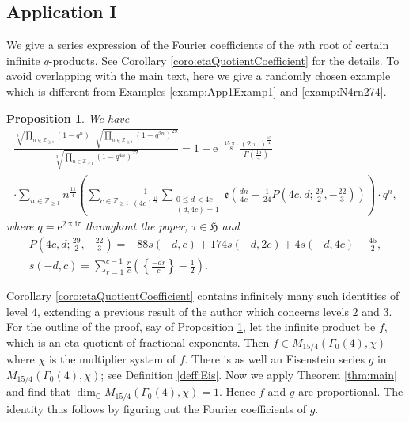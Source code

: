 \documentclass[12pt]{amsart}
\numberwithin{equation}{section}
\theoremstyle{plain}
\newtheorem{prop}[thm]{Proposition}
\theoremstyle{definition}
\theoremstyle{remark}
\newcommand\twoscript[2]{\substack{{#1} \\ {#2}}}
\newcommand\rmi{\mathrm{i}}
\newcommand\rme{\mathrm{e}}
\newcommand\etp[1]{\mathfrak{e}\left(#1\right)}
\newcommand\numC{\mathbb{C}}
\newcommand\numgeq[2]{\mathbb{#1}_{\geq #2}}
\newcommand\uhp{\mathfrak{H}}
\begin{document}
\subsection{Application I}
\label{subsec:AppI}
We give a series expression of the Fourier coefficients of the $n$th root of certain infinite $q$-products. See Corollary \ref{coro:etaQuotientCoefficient} for the details. To avoid overlapping with the main text, here we give a randomly chosen example which is different from Examples \ref{examp:App1Examp1} and \ref{examp:N4rn274}.
\begin{prop}
\label{prop:inIntroExamp}
We have
\begin{multline*}
\frac{\sqrt[3]{\prod_{n\in\numgeq{Z}{1}}(1-q^n)}\cdot\sqrt{\prod_{n\in\numgeq{Z}{1}}(1-q^{2n})^{29}}}{\sqrt[3]{\prod_{n\in\numgeq{Z}{1}}(1-q^{4n})^{22}}}=1+\rme^{-\frac{15\uppi\rmi}{8}}\frac{(2\uppi)^{\frac{15}{4}}}{\Gamma(\frac{15}{4})}\\
\cdot\sum_{n\in\numgeq{Z}{1}}n^{\frac{11}{4}}\left(\sum_{c\in\numgeq{Z}{1}}\frac{1}{(4c)^{\frac{15}{4}}}\sum_{\twoscript{0\leq d<4c}{(d,4c)=1}}\etp{\frac{dn}{4c}-\frac{1}{24}P(4c,d;\frac{29}{2},-\frac{22}{3})}\right)\cdot q^n,
\end{multline*}
where $q=\rme^{2\uppi\rmi\tau}$ throughout the paper, $\tau\in\uhp$ and
\begin{gather*}
P(4c,d;\frac{29}{2},-\frac{22}{3})=-88s(-d,c)+174s(-d,2c)+4s(-d,4c)-\frac{45}{2},\\
s(-d,c)=\sum_{r=1}^{c-1}\frac{r}{c}\left(\left\{\frac{-dr}{c}\right\}-\frac{1}{2}\right).
\end{gather*}
\end{prop}

Corollary \ref{coro:etaQuotientCoefficient} contains infinitely many such identities of level $4$, extending a previous result of the author \cite[Theorem 7.1]{Zhu23} which concerns levels $2$ and $3$. For the outline of the proof, say of Proposition \ref{prop:inIntroExamp}, let the infinite product be $f$, which is an eta-quotient of fractional exponents. Then $f\in M_{15/4}(\Gamma_0(4),\chi)$ where $\chi$ is the multiplier system of $f$. There is as well an Eisenstein series $g$ in $M_{15/4}(\Gamma_0(4),\chi)$; see Definition \ref{deff:Eis}. Now we apply Theorem \ref{thm:main} and find that $\dim_\numC M_{15/4}(\Gamma_0(4),\chi)=1$. Hence $f$ and $g$ are proportional. The identity thus follows by figuring out the Fourier coefficients of $g$.
\end{document}
